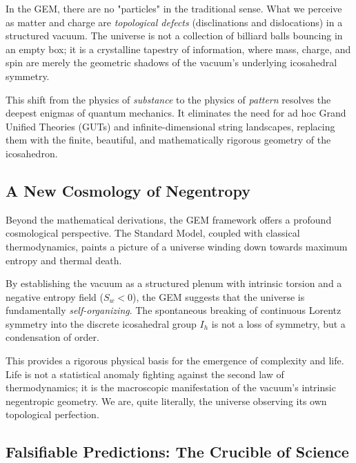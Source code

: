 \begin{remark}
In the GEM, there are no "particles" in the traditional sense. What we perceive as matter and charge are \textit{topological defects} (disclinations and dislocations) in a structured vacuum. The universe is not a collection of billiard balls bouncing in an empty box; it is a crystalline tapestry of information, where mass, charge, and spin are merely the geometric shadows of the vacuum's underlying icosahedral symmetry.
\end{remark}

This shift from the physics of \textit{substance} to the physics of \textit{pattern} resolves the deepest enigmas of quantum mechanics. It eliminates the need for ad hoc Grand Unified Theories (GUTs) and infinite-dimensional string landscapes, replacing them with the finite, beautiful, and mathematically rigorous geometry of the icosahedron.

\subsection{A New Cosmology of Negentropy}

Beyond the mathematical derivations, the GEM framework offers a profound cosmological perspective. The Standard Model, coupled with classical thermodynamics, paints a picture of a universe winding down towards maximum entropy and thermal death. 

By establishing the vacuum as a structured plenum with intrinsic torsion and a negative entropy field ($S_w < 0$), the GEM suggests that the universe is fundamentally \textit{self-organizing}. The spontaneous breaking of continuous Lorentz symmetry into the discrete icosahedral group $I_h$ is not a loss of symmetry, but a condensation of order. 

This provides a rigorous physical basis for the emergence of complexity and life. Life is not a statistical anomaly fighting against the second law of thermodynamics; it is the macroscopic manifestation of the vacuum's intrinsic negentropic geometry. We are, quite literally, the universe observing its own topological perfection.

\subsection{Falsifiable Predictions: The Crucible of Science}

